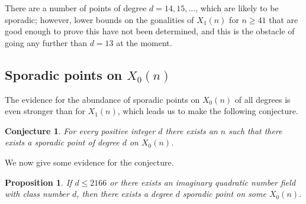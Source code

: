 \documentclass[11pt,reqno]{amsart}
\newtheorem{conjecture}[theorem]{Conjecture}
\newtheorem{proposition}[theorem]{Proposition}
\theoremstyle{definition}
\numberwithin{equation}{section}
\begin{document}
There are a number of points of degree $d=14,15, \ldots$, which are likely to be sporadic; however, lower bounds on the gonalities of $X_1(n)$ for $n\geq 41$ that are good enough to prove this have not been determined, and this is the obstacle of going any further than $d=13$ at the moment. 

\subsection{Sporadic points on \texorpdfstring{$X_0(n)$}{X0(n)}}
The evidence for the abundance of sporadic points on $X_0(n)$ of all degrees is even stronger than for $X_1(n)$, which leads us to make the following conjecture. 
\begin{conjecture}
For every positive integer $d$ there exists an $n$ such that there exists a sporadic point of degree $d$ on $X_0(n)$.\end{conjecture}

We now give some evidence for the conjecture. 


\begin{proposition} \label{sporadic}
    If $d\leq 2166$ or there exists an imaginary quadratic number field with class number $d$, then there exists a degree $d$ sporadic point on some $X_0(n)$. 
\end{proposition}
\end{document}
